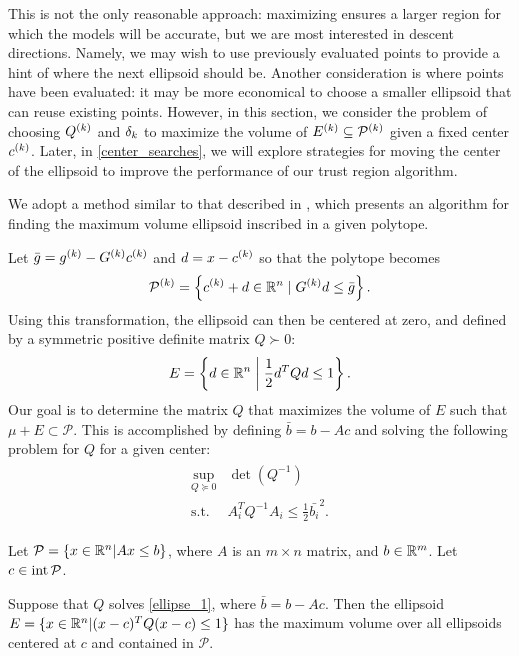 This is not the only reasonable approach: maximizing ensures a larger region for which the models will be accurate, 
but we are most interested in descent directions.
Namely, we may wish to use previously evaluated points to provide a hint of where the next ellipsoid should be.
Another consideration is where points have been evaluated: it may be more economical to choose a smaller ellipsoid that can reuse existing points.
However, in this section,  we consider the problem of choosing ${Q^{(k)}}$ and $\delta_k$ to maximize the volume of ${E^{(k)}} \subseteq {{\mathcal{P}}^{(k)}}$ given a fixed center $c^{(k)}$.
Later, in \cref{center_searches}, we will explore strategies for moving the center of the ellipsoid to improve the performance of our trust region algorithm.

We adopt a method similar to that described in \cite{Khachiyan1993},
which presents an algorithm for finding the maximum volume ellipsoid inscribed in a given polytope.

Let $\bar g = {g^{(k)}} - G^{(k)} c^{(k)}$ and $d = x - c^{(k)}$ so that the polytope becomes
\begin{align*}
{{\mathcal{P}}^{(k)}} = \left\{ c^{(k)} + d \in \mathbb R^n \; | \;  G^{(k)} d \le \bar{g} \right\}.
\end{align*}
Using this transformation, the ellipsoid can then be centered at zero, and defined by a symmetric positive definite matrix $Q \succ 0$:
\begin{align*}
E = \left\{ d \in \mathbb R^n \; \bigg | \; \frac 1 2 d^T Q d \le 1 \right\}.
\end{align*}
Our goal is to determine the matrix $Q$ that maximizes the volume of $E$ such that $\mu + E \subset \mathcal{P}$.
This is accomplished by defining $\bar b = b - Ac$ and solving the following problem for $Q$ for a given center:
 \begin{align}
\begin{array}{cc}
 \sup_{Q \succeq 0} & \det(Q^{-1})  \\
 \textrm{s.t.} & A_i^T Q^{-1} A_i \le \frac 1 2 \bar{b_i}^2.
\end{array}
 \label{ellipse_1}
\end{align}


\begin{theorem} 

Let $\mathcal{P} = \{x \in \mathbb R^n | Ax \le b\}$, 
where $A$ is an $m \times n$ matrix, 
and $b \in \mathbb R^m$.  Let $c \in \operatorname{int}{\mathcal{P}}$.

Suppose that $Q$ solves \cref{ellipse_1}, where $\bar{b} = b - Ac$.
Then the ellipsoid $E = \{ x \in \mathbb R^n | (x-c)^T Q(x-c) \le 1\}$ has the maximum volume over all ellipsoids centered at $c$ and contained in $\mathcal{P}$.
\end{theorem}

